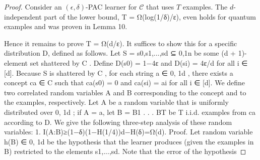 \documentclass[main.tex]{subfiles}
\begin{document}
\begin{proof} 
Consider an $(\epsilon,\delta)$-PAC learner for $\mathcal{C}$ that uses $T$ examples. The $d$-independent part of the lower bound, T = Ω(log(1/δ)/ε), even holds for quantum examples and was proven in Lemma 10. 

Hence it remains to prove T = Ω(d/ε). It suffices to show this for a specific distribution D, defined as follows. Let S = {s0,s1,...,sd} ⊆ {0,1}n be some (d + 1)-element set shattered by C . Define D(s0) = 1−4ε and D(si) = 4ε/d for all i ∈ [d].
Because S is shattered by C , for each string a ∈ {0, 1}d , there exists a concept ca ∈ C such that ca(s0) = 0 and ca(si) = ai for all i ∈ [d]. We define two correlated random variables A and B corresponding to the concept and to the examples, respectively. Let A be a random variable that is uniformly distributed over {0, 1}d ; if A = a, let B = B1 . . . BT be T i.i.d. examples from ca according to D. We give the following three-step analysis of these random variables:
1. I(A:B)≥(1−δ)(1−H(1/4))d−H(δ)=Ω(d).
Proof. Let random variable h(B) ∈ {0, 1}d be the hypothesis that the learner produces (given
the examples in B) restricted to the elements s1,...,sd. Note that the error of the hypothesis
\end{proof}
\end{document}
